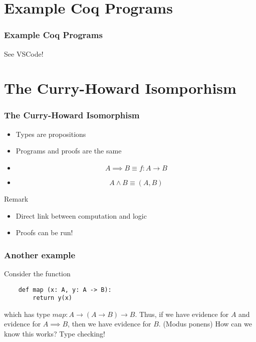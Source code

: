 \documentclass{beamer}
\begin{document}
\section{Example Coq Programs}
\begin{frame}
\frametitle{Example Coq Programs}
    See VSCode!
\end{frame}

\section{The Curry-Howard Isomporhism}
\begin{frame}
\frametitle{The Curry-Howard Isomorphism}
\begin{theorem}
    \begin{itemize}
        \item Types are propositions
        \item Programs and proofs are the same
    \end{itemize}
\end{theorem}

\begin{examples}
    \begin{itemize}
        \item $$A \implies B \equiv f: A \to B$$
        \item $$A \wedge B \equiv (A, B)$$
    \end{itemize}
\end{examples}

\begin{block}{Remark}
    \begin{itemize}
    \item Direct link between computation and logic
    \item Proofs can be run!
    \end{itemize}
\end{block}
\end{frame}

\begin{frame}[fragile]
\frametitle{Another example}

\begin{example}
    Consider the function \begin{verbatim}
    def map (x: A, y: A -> B):
        return y(x) \end{verbatim} which has type $map: A \to (A \to B) \to B$. Thus, if we have evidence for $A$ and evidence for $A \implies B$, then we have evidence for $B$. (Modus ponens)
        \newline
        How can we know this works? Type checking!
\end{example}
\end{frame}
\end{document}
